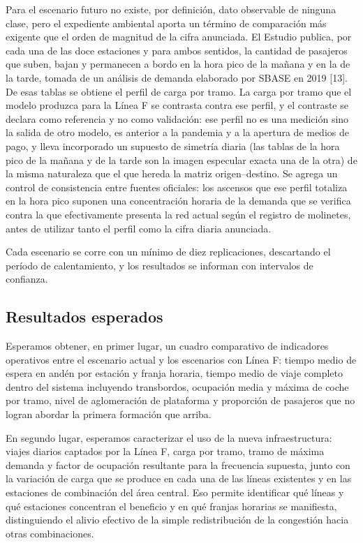\documentclass{article}
\begin{document}
Para el escenario futuro no existe, por definición, dato observable de ninguna clase, pero el expediente
ambiental aporta un término de comparación más exigente que el orden de magnitud de la cifra anunciada. El
Estudio publica, por cada una de las doce estaciones y para ambos sentidos, la cantidad de pasajeros que
suben, bajan y permanecen a bordo en la hora pico de la mañana y en la de la tarde, tomada de un análisis de
demanda elaborado por SBASE en 2019 [13]. De esas tablas se obtiene el perfil de carga por tramo. La carga por tramo que el modelo produzca para la Línea F se contrasta
contra ese perfil, y el contraste se declara como referencia y no como validación: ese perfil no es una
medición sino la salida de otro modelo, es anterior a la pandemia y a la apertura de medios de pago, y
lleva incorporado un supuesto de simetría diaria (las tablas de la hora pico de la mañana y de la tarde son
la imagen especular exacta una de la otra) de la misma naturaleza que el que hereda la matriz
origen--destino. Se agrega un control de consistencia entre fuentes oficiales: los ascensos que ese
perfil totaliza en la hora pico suponen una concentración horaria de la demanda que se verifica contra la
que efectivamente presenta la red actual según el registro de molinetes, antes de utilizar tanto el perfil
como la cifra diaria anunciada.

Cada escenario se corre con un mínimo de diez replicaciones, descartando el período de calentamiento, y los
resultados se informan con intervalos de confianza.

\subsection{Resultados esperados}

Esperamos obtener, en primer lugar, un cuadro comparativo de indicadores operativos entre el escenario
actual y los escenarios con Línea F: tiempo medio de espera en andén por estación y franja horaria, tiempo
medio de viaje completo dentro del sistema incluyendo transbordos, ocupación media y máxima de coche por
tramo, nivel de aglomeración de plataforma y proporción de pasajeros que no logran abordar la primera
formación que arriba.

En segundo lugar, esperamos caracterizar el uso de la nueva infraestructura: viajes diarios captados por la
Línea F, carga por tramo, tramo de máxima demanda y factor de ocupación resultante para la frecuencia
supuesta, junto con la variación de carga que se produce en cada una de las líneas existentes y en las
estaciones de combinación del área central. Eso permite identificar qué líneas y qué estaciones concentran
el beneficio y en qué franjas horarias se manifiesta, distinguiendo el alivio efectivo de la simple
redistribución de la congestión hacia otras combinaciones.
\end{document}
